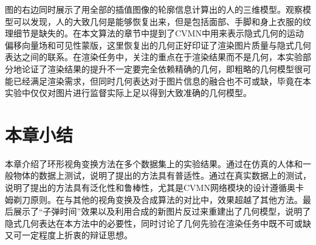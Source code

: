 图的右边同时展示了用全部的插值图像的轮廓信息计算出的人的三维模型。观察模型可以发现，人的大致几何是能够恢复出来，但是包括面部、手脚和身上衣服的纹理细节是缺失的。在本文算法的章节中提到了CVMN中用来表示隐式几何的运动偏移向量场和可见性蒙版，这里恢复出的几何正好印证了渲染图片质量与隐式几何表达之间的联系。在渲染任务中，关注的重点在于渲染结果而不是几何，本实验部分地论证了渲染结果的提升不一定要完全依赖精确的几何，即粗略的几何模型很可能已经满足渲染需求，但同时几何表达对于图片信息的融合也不可或缺，毕竟在本实验中仅仅对图片进行监督实际上足以得到大致准确的几何模型。

\section{本章小结}
本章介绍了环形视角变换方法在多个数据集上的实验结果。通过在仿真的人体和一般物体的数据上测试，说明了提出的方法具有普适性。通过在真实数据上的测试，说明了提出的方法具有泛化性和鲁棒性，尤其是CVMN网络模块的设计遵循奥卡姆剃刀原则。在与其他的视角变换及合成算法的对比中，效果超越了其他方法。最后展示了“子弹时间”效果以及利用合成的新图片反过来重建出了几何模型，说明了隐式几何表达在本方法中的必要性，同时讨论了几何先验在渲染任务中既不可或缺又可一定程度上折衷的辩证思想。

